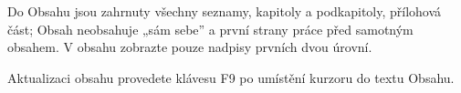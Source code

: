 \setcounter{tocdepth}{1}


{\color{darkBlue}
Do Obsahu jsou zahrnuty všechny seznamy, kapitoly a podkapitoly, přílohová část; Obsah neobsahuje „sám sebe” a první strany práce před samotným obsahem. V obsahu zobrazte pouze nadpisy prvních dvou úrovní.

Aktualizaci obsahu provedete klávesu F9 po umístění kurzoru do textu Obsahu.
}

\vspace{9pt}
{\setlength{\parskip}{0pt}
\makeatletter
{}
\makeatother
\par}

\pagebreak
